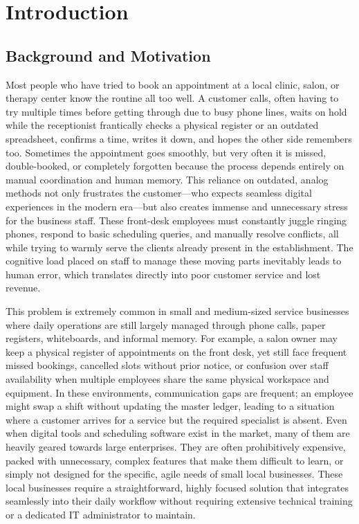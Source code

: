 \chapter{Introduction}

\section{Background and Motivation}
Most people who have tried to book an appointment at a local clinic, salon, or therapy center know the routine all too well. A customer calls, often having to try multiple times before getting through due to busy phone lines, waits on hold while the receptionist frantically checks a physical register or an outdated spreadsheet, confirms a time, writes it down, and hopes the other side remembers too. Sometimes the appointment goes smoothly, but very often it is missed, double-booked, or completely forgotten because the process depends entirely on manual coordination and human memory. This reliance on outdated, analog methods not only frustrates the customer—who expects seamless digital experiences in the modern era—but also creates immense and unnecessary stress for the business staff. These front-desk employees must constantly juggle ringing phones, respond to basic scheduling queries, and manually resolve conflicts, all while trying to warmly serve the clients already present in the establishment. The cognitive load placed on staff to manage these moving parts inevitably leads to human error, which translates directly into poor customer service and lost revenue.

This problem is extremely common in small and medium-sized service businesses where daily operations are still largely managed through phone calls, paper registers, whiteboards, and informal memory. For example, a salon owner may keep a physical register of appointments on the front desk, yet still face frequent missed bookings, cancelled slots without prior notice, or confusion over staff availability when multiple employees share the same physical workspace and equipment. In these environments, communication gaps are frequent; an employee might swap a shift without updating the master ledger, leading to a situation where a customer arrives for a service but the required specialist is absent. Even when digital tools and scheduling software exist in the market, many of them are heavily geared towards large enterprises. They are often prohibitively expensive, packed with unnecessary, complex features that make them difficult to learn, or simply not designed for the specific, agile needs of small local businesses. These local businesses require a straightforward, highly focused solution that integrates seamlessly into their daily workflow without requiring extensive technical training or a dedicated IT administrator to maintain.

